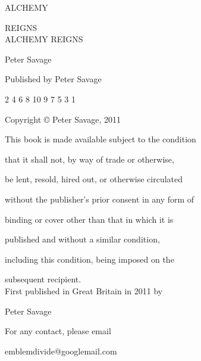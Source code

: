 ﻿\begin{center}

ALCHEMY

REIGNS
\\[1in]
ALCHEMY REIGNS

Peter Savage

Published by Peter Savage

2 4 6 8 10 9 7 5 3 1

Copyright © Peter Savage, 2011

This book is made available subject to the condition 

that it shall not, by way of trade or otherwise, 

be lent, resold, hired out, or otherwise circulated 

without the publisher's prior consent in any form of 

binding or cover other than that in which it is 

published and without a similar condition,

including this condition, being imposed on the 

subsequent recipient.
\\[1in]
First published in Great Britain in 2011 by

Peter Savage

For any contact, please email

emblemdivide@googlemail.com
\end{center}












